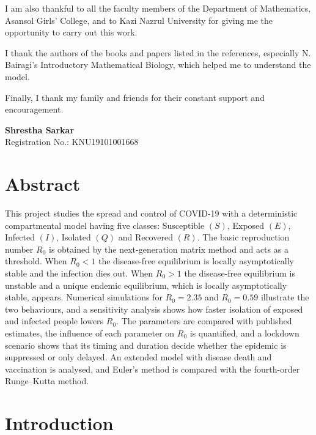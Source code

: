 \documentclass[12pt,a4paper]{article}
\theoremstyle{definition}
\begin{document}
I am also thankful to all the faculty members of the Department of Mathematics, Asansol Girls' College, and to Kazi Nazrul University for giving me the opportunity to carry out this work.

I thank the authors of the books and papers listed in the references, especially N. Bairagi's Introductory Mathematical Biology, which helped me to understand the model.

Finally, I thank my family and friends for their constant support and encouragement.

\vspace{1.5em}
\hfill\begin{minipage}{0.5\textwidth}
\raggedleft
\textbf{Shrestha Sarkar}\\
Registration No.: KNU19101001668
\end{minipage}
\clearpage

\tableofcontents
\clearpage
{}

\section*{Abstract}

This project studies the spread and control of COVID-19 with a deterministic compartmental model having five classes: Susceptible $(S)$, Exposed $(E)$, Infected $(I)$, Isolated $(Q)$ and Recovered $(R)$. The basic reproduction number $R_{0}$ is obtained by the next-generation matrix method and acts as a threshold. When $R_{0} < 1$ the disease-free equilibrium is locally asymptotically stable and the infection dies out. When $R_{0} > 1$ the disease-free equilibrium is unstable and a unique endemic equilibrium, which is locally asymptotically stable, appears. Numerical simulations for $R_{0} = 2.35$ and $R_{0} = 0.59$ illustrate the two behaviours, and a sensitivity analysis shows how faster isolation of exposed and infected people lowers $R_{0}$. The parameters are compared with published estimates, the influence of each parameter on $R_{0}$ is quantified, and a lockdown scenario shows that its timing and duration decide whether the epidemic is suppressed or only delayed. An extended model with disease death and vaccination is analysed, and Euler's method is compared with the fourth-order Runge–Kutta method.


\section{Introduction}
\end{document}
